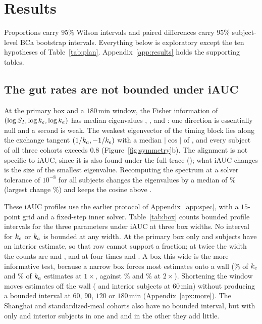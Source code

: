 \section{Results}
\label{sec:results}

Proportions carry $95\%$ Wilson intervals and paired differences carry $95\%$ subject-level BCa bootstrap intervals.
Everything below is exploratory except the ten hypotheses of Table~\ref{tab:plan}. Appendix~\ref{app:results} holds the supporting tables.

\subsection{The gut rates are not bounded under iAUC}
\label{sec:timing}\label{sec:structural}

At the primary box and a $180$\,min window, the Fisher information of $(\log S_I,\log k_e,\log k_a)$ has median eigenvalues \resEigMedianOne, \resEigMedianTwo, and \resEigMedianThree: one direction is essentially null and a second is weak.
The weakest eigenvector of the timing block lies along the exchange tangent $(1/k_a,-1/k_e)$ with a median $|\cos|$ of \resCosineIaucOne, and every subject of all three cohorts exceeds $0.8$ (Figure~\ref{fig:symmetry}b).
The alignment is not specific to iAUC, since it is also found under the full trace (\resCosineTraceOne); what iAUC changes is the size of the smallest eigenvalue.
Recomputing the spectrum at a solver tolerance of $10^{-8}$ for all \resTolN{} subjects changes the eigenvalues by a median of \resTolMedianRelChange\% (largest change \resTolMaxRelChange\%) and keeps the cosine above \resTolMinCosine.

These iAUC profiles use the earlier protocol of Appendix~\ref{app:spec}, with a $15$-point grid and a fixed-step inner solver.
Table~\ref{tab:box} counts bounded profile intervals for the three parameters under iAUC at three box widths.
No interval for $k_e$ or $k_a$ is bounded at any width.
At the primary box only \resBoxOneKeInt{} and \resBoxOneKaInt{} subjects have an interior estimate, so that row cannot support a fraction; at twice the width the counts are \resBoxTwoKeInt{} and \resBoxTwoKaInt, and at four times \resBoxFourKeInt{} and \resBoxFourKaInt.
A box this wide is the more informative test, because a narrow box forces most estimates onto a wall (\resPinnedFracKeOne\% of $k_e$ and \resPinnedFracKaOne\% of $k_a$ estimates at $1\times$, against \resPinnedFracKeTwo\% and \resPinnedFracKaTwo\% at $2\times$).
Shortening the window moves estimates off the wall (\resWinProfSixtyKeInt{} and \resWinProfSixtyKaInt{} interior subjects at $60$\,min) without producing a bounded interval at $60$, $90$, $120$ or $180$\,min (Appendix~\ref{apx:more}).
The Shanghai and standardized-meal cohorts also have no bounded interval, but with only \resRepShanghaiOneInteriorKe{} and \resRepShanghaiOneInteriorKa{} interior subjects in one and \resRepHallOneInteriorKe{} and \resRepHallOneInteriorKa{} in the other they add little.


